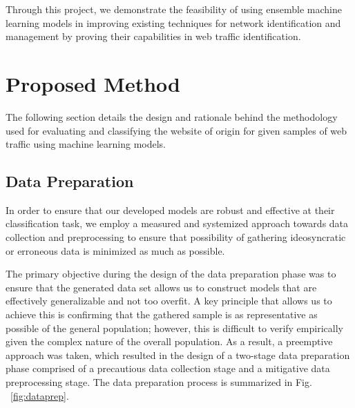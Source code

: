 \documentclass[10pt,sigconf,letterpaper,nonacm]{acmart}
\begin{document}
Through this project, we demonstrate the feasibility of using ensemble machine learning models in improving existing techniques for network identification and management by proving their capabilities in web traffic identification.


\section{Proposed Method}

The following section details the design and rationale behind the methodology used for evaluating and classifying the website of origin for given samples of web traffic using machine learning models.

\subsection{Data Preparation}

In order to ensure that our developed models are robust and effective at their classification task, we employ a measured and systemized approach towards data collection and preprocessing to ensure that possibility of gathering ideosyncratic or erroneous data is minimized as much as possible.

The primary objective during the design of the data preparation phase was to ensure that the generated data set allows us to construct models that are effectively generalizable and not too overfit.
A key principle that allows us to achieve this is confirming that the gathered sample is as representative as possible of the general population; however, this is difficult to verify empirically given the complex nature of the overall population.
As a result, a preemptive approach was taken, which resulted in the design of a two-stage data preparation phase comprised of a precautious data collection stage and a mitigative data preprocessing stage.
The data preparation process is summarized in Fig. ~\ref{fig:dataprep}.
\end{document}

